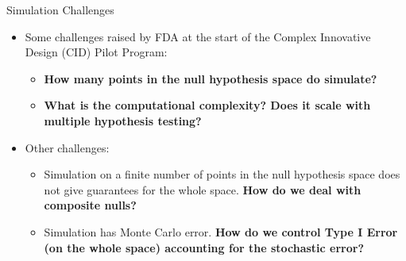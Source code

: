 \begin{frame}{Simulation Challenges}
\begin{itemize}
    \item Some challenges raised by FDA at the start of the Complex Innovative Design (CID) Pilot Program:
    \begin{itemize}
        \item \textbf{How many points in the null hypothesis space do simulate?}
        \item \textbf{What is the computational complexity? Does it scale with multiple hypothesis testing?}
    \end{itemize}
    \item Other challenges:
    \begin{itemize}
        \item Simulation on a finite number of points
        in the null hypothesis space does not give guarantees for the whole space. 
        \textbf{How do we deal with composite nulls?}
        \item Simulation has Monte Carlo error. 
        \textbf{How do we control
        Type I Error (on the whole space) 
        accounting for the stochastic error?}
    \end{itemize}
\end{itemize}
\end{frame}
